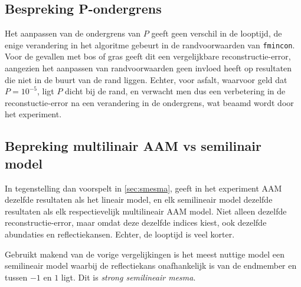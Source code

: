 \documentclass[12pt]{report}
\begin{document}
\subsection{Bespreking P-ondergrens}

Het aanpassen van de ondergrens van $P$ geeft geen verschil in de looptijd, de enige verandering in het algoritme gebeurt in de randvoorwaarden van \texttt{fmincon}. Voor de gevallen met bos of gras geeft dit een vergelijkbare reconstructie-error, aangezien het aanpassen van randvoorwaarden geen invloed heeft op resultaten die niet in de buurt van de rand liggen. Echter, voor asfalt, waarvoor geld dat $P=10^{-5}$, ligt $P$ dicht bij de rand, en verwacht men dus een verbetering in de reconstuctie-error na een verandering in de ondergrens, wat beaamd wordt door het experiment.

\subsection{Bepreking multilinair AAM vs semilinair model}

In tegenstelling dan voorspelt in \ref{sec:smesma}, geeft in het experiment AAM dezelfde resultaten als het lineair model, en elk semilineair model dezelfde resultaten als elk respectievelijk multilineair AAM model. Niet alleen dezelfde reconstructie-error, maar omdat deze dezelfde indices kiest, ook dezelfde abundaties en reflectiekansen. Echter, de looptijd is veel korter. 

\vspace{5 mm}

Gebruikt makend van de vorige vergelijkingen is het meest nuttige model een semilineair model waarbij de reflectiekans onafhankelijk is van de endmember en tussen $-1$ en $1$ ligt. Dit is \textit{strong semilineair mesma}.


\begin{flushleft}
\nocite{*}
{}


\end{flushleft}
\end{document}
